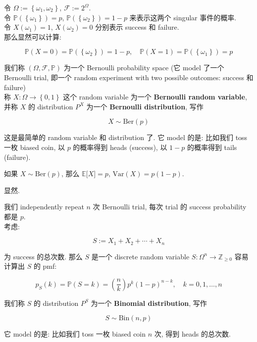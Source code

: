 \documentclass{qlnotes-export}
\begin{document}
\begin{example}

令 \(\Omega := \left\{ {\omega_{1},\omega_{2}} \right\}\), \(\mathcal{F} := 2^{\Omega}\).\\
令 \({\mathbb{P}}(\left\{ \omega_{1} \right\}) = p\), \({\mathbb{P}}(\left\{ \omega_{2} \right\}) = 1 - p\) 来表示这两个 singular 事件的概率.\\
令 \(X(\omega_{1}) = 1\), \(X(\omega_{2}) = 0\) 分别表示 success 和 failure.\\
那么显然可以计算:

\[{\mathbb{P}}(X = 0) = {\mathbb{P}}(\left\{ \omega_{2} \right\}) = 1 - p,\quad{\mathbb{P}}(X = 1) = {\mathbb{P}}(\left\{ \omega_{1} \right\}) = p\]

我们称 \((\Omega,\mathcal{F},{\mathbb{P}})\) 为一个 Bernoulli probability space (它 model 了一个 Bernoulli trial, 即一个 random experiment with two possible outcomes: success 和 failure)\\
称 \(X:\Omega\rightarrow\left\{ {0,1} \right\}\) 这个 random variable 为一个 \textbf{Bernoulli random variable}, 并称 \(X\) 的 distribution \(P^{X}\) 为一个 \textbf{Bernoulli distribution}, 写作

\[X \sim \text{Ber}(p)\]

这是最简单的 random variable 和 distribution 了. 它 model 的是: 比如我们 toss 一枚 biased coin, 以 \(p\) 的概率得到 heads (success), 以 \(1 - p\) 的概率得到 tails (failure).\\

\end{example}

\begin{proposition}

如果 \(X \sim \text{Ber}(p)\), 那么 \({\mathbb{E}}\lbrack X\rbrack = p\), \(\text{Var}(X) = p(1 - p)\).

\end{proposition}

显然.

\begin{example}

我们 independently repeat \(n\) 次 Bernoulli trial, 每次 trial 的 success probability 都是 \(p\).\\
考虑:

\[S := X_{1} + X_{2} + \cdots + X_{n}\]

为 success 的总次数. 那么 \(S\) 是一个 discrete random variable \(S:\Omega^{n}\rightarrow{\mathbb{Z}}_{\geq 0}\) 容易计算出 \(S\) 的 pmf:

\[p_{S}(k) = {\mathbb{P}}(S = k) = \left( \frac{n}{k} \right)p^{k}(1 - p)^{n - k},\quad k = 0,1,\ldots,n\]

我们称 \(S\) 的 distribution \(P^{S}\) 为一个 \textbf{Binomial distribution}, 写作

\[S \sim \text{Bin}(n,p)\]

它 model 的是: 比如我们 toss 一枚 biased coin \(n\) 次, 得到 heads 的总次数.\\

\end{example}
\end{document}
